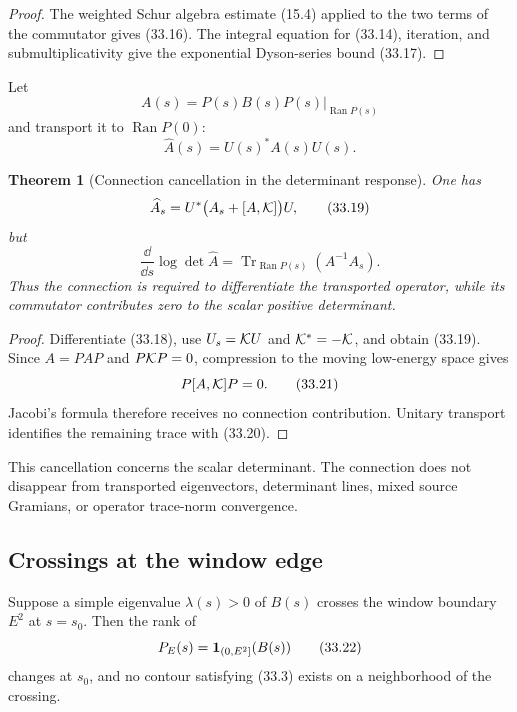 \documentclass[11pt]{article}
\newtheorem{theorem}{Theorem}[section]
\theoremstyle{remark}
\begin{document}
\begin{proof}
The weighted Schur algebra estimate (15.4) applied to the two terms
of the commutator gives (33.16).  The integral equation for
(33.14), iteration, and submultiplicativity give the exponential
Dyson-series bound (33.17).
\end{proof}

Let
\[
 A(s)=P(s)B(s)P(s)|_{\operatorname{Ran}P(s)}
\]
and transport it to \(\operatorname{Ran}P(0)\):
\[
 \widehat A(s)=U(s)^*A(s)U(s).                             \tag{33.18}
\]

\begin{theorem}[Connection cancellation in the determinant
response]
\label{thm:v15v33-connection}
One has
\[
 \widehat A_s
 =
 U^*\bigl(A_s+[A,{\cal K}]\bigr)U,                         \tag{33.19}
\]
but
\[
 \boxed{
 \frac{\dd}{\dd s}\log\det\widehat A
 =
 \operatorname{Tr}_{\operatorname{Ran}P(s)}
 (A^{-1}A_s).}                                             \tag{33.20}
\]
Thus the connection is required to differentiate the transported
operator, while its commutator contributes zero to the scalar
positive determinant.
\end{theorem}

\begin{proof}
Differentiate (33.18), use \(U_s={\cal K}U\) and
\({\cal K}^*=-{\cal K}\), and obtain (33.19).  Since \(A=PAP\) and \(P{\cal K}P=0\), compression to the moving
low-energy space gives
\[
 P[A,{\cal K}]P=0.                                         \tag{33.21}
\]
Jacobi's formula therefore receives no connection contribution.
Unitary transport identifies the remaining trace with (33.20).
\end{proof}

This cancellation concerns the scalar determinant.  The connection
does not disappear from transported eigenvectors, determinant
lines, mixed source Gramians, or operator trace-norm convergence.

\subsection{Crossings at the window edge}

Suppose a simple eigenvalue \(\lambda(s)>0\) of \(B(s)\) crosses
the window boundary \(E^2\) at \(s=s_0\).  Then the rank of
\[
 P_E(s)={\bf 1}_{(0,E^2]}(B(s))                             \tag{33.22}
\]
changes at \(s_0\), and no contour satisfying (33.3) exists on a
neighborhood of the crossing.
\end{document}
